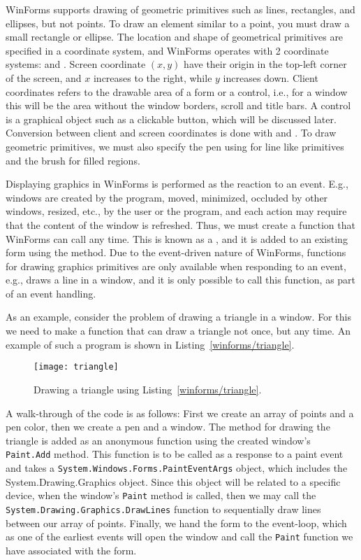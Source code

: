 WinForms supports drawing of geometric primitives such as lines, rectangles, and ellipses, but not points. To draw an element similar to a point, you must draw a small rectangle or ellipse. The location and shape of geometrical primitives are specified in a coordinate system, and WinForms operates with 2 coordinate systems:  and . Screen coordinate $(x,y)$ have their origin in the top-left corner of the screen, and $x$ increases to the right, while $y$ increases down. Client coordinates refers to the drawable area of a form or a control, i.e., for a window this will be the area without the window borders, scroll and title bars. A control is a graphical object such as a clickable button, which will be discussed later. Conversion between client and screen coordinates is done with  and . To draw geometric primitives, we must also specify the pen using
for line like primitives and the brush for filled regions.

Displaying graphics in WinForms is performed as the reaction to an event. E.g., windows are created by the program, moved, minimized, occluded by other windows, resized, etc., by the user or the program, and each action may require that the content of the window is refreshed. Thus, we must create a function that WinForms can call any time. This is known as a , and it is added to an existing form using the  method. Due to the event-driven nature of WinForms, functions for drawing graphics primitives are only available when responding to an event, e.g.,  draws a line in a window, and it is only possible to call this function, as part of an event handling.

As an example, consider the problem of drawing a triangle in a window. For this we need to make a function that can draw a triangle not once, but any time. An example of such a program is shown in Listing~\ref{winforms/triangle}.
%
%
\begin{figure}
  \centering
  \texttt{[image: triangle]}
  \caption{Drawing a triangle using Listing~\ref{winforms/triangle}.}
  \label{fig:triangle}
\end{figure}
A walk-through of the code is as follows: First we create an array of points and a pen color, then we create a pen and a window. The method for drawing the triangle is added as an anonymous function using the created window's \lstinline!Paint.Add! method. This function is to be called as a response to a paint event and takes a \lstinline!System.Windows.Forms.PaintEventArgs! object, which includes the System.Drawing.Graphics object. Since this object will be related to a specific device, when the window's \lstinline!Paint! method is called, then we may call the \lstinline!System.Drawing.Graphics.DrawLines! function to sequentially draw lines between our array of points. Finally, we hand the form to the event-loop, which as one of the earliest events will open the window and call the \lstinline!Paint! function we have associated with the form.

